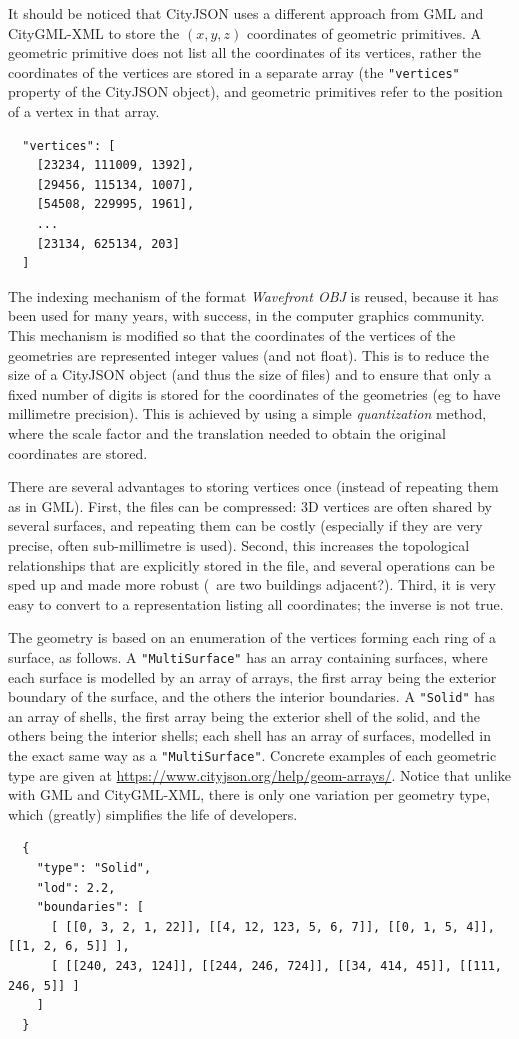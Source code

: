 It should be noticed that CityJSON uses a different approach from GML and CityGML-XML to store the $(x,y,z)$ coordinates of geometric primitives.
A geometric primitive does not list all the coordinates of its vertices, rather the coordinates of the vertices are stored in a separate array (the \texttt{"vertices"} property of the CityJSON object), and geometric primitives refer to the position of a vertex in that array.
\begin{lstlisting}
  "vertices": [
    [23234, 111009, 1392],
    [29456, 115134, 1007],
    [54508, 229995, 1961],
    ...
    [23134, 625134, 203]
  ]
\end{lstlisting}
The indexing mechanism of the format \emph{Wavefront OBJ} is reused, because it has been used for many years, with success, in the computer graphics community.
This mechanism is modified so that the coordinates of the vertices of the geometries are represented integer values (and not float).
This is to reduce the size of a CityJSON object (and thus the size of files) and to ensure that only a fixed number of digits is stored for the coordinates of the geometries (eg to have millimetre precision).
This is achieved by using a simple \emph{quantization} method, where the scale factor and the translation needed to obtain the original coordinates are stored.

There are several advantages to storing vertices once (instead of repeating them as in GML).
First, the files can be compressed: 3D vertices are often shared by several surfaces, and repeating them can be costly (especially if they are very precise, often sub-millimetre is used).
Second, this increases the topological relationships that are explicitly stored in the file, and several operations can be sped up and made more robust (\eg\ are two buildings adjacent?).
Third, it is very easy to convert to a representation listing all coordinates; the inverse is not true. 

%

The geometry is based on an enumeration of the vertices forming each ring of a surface, as follows.
A \texttt{"MultiSurface"} has an array containing surfaces, where each surface is modelled by an array of arrays, the first array being the exterior boundary of the surface, and the others the interior boundaries.
A \texttt{"Solid"} has an array of shells, the first array being the exterior shell of the solid, and the others being the interior shells; each shell has an array of surfaces, modelled in the exact same way as a \texttt{"MultiSurface"}.
Concrete examples of each geometric type are given at \url{https://www.cityjson.org/help/geom-arrays/}.
Notice that unlike with GML and CityGML-XML, there is only one variation per geometry type, which (greatly) simplifies the life of developers.
\begin{lstlisting}
  {
    "type": "Solid",
    "lod": 2.2,
    "boundaries": [
      [ [[0, 3, 2, 1, 22]], [[4, 12, 123, 5, 6, 7]], [[0, 1, 5, 4]], [[1, 2, 6, 5]] ], 
      [ [[240, 243, 124]], [[244, 246, 724]], [[34, 414, 45]], [[111, 246, 5]] ] 
    ]
  }
\end{lstlisting}


